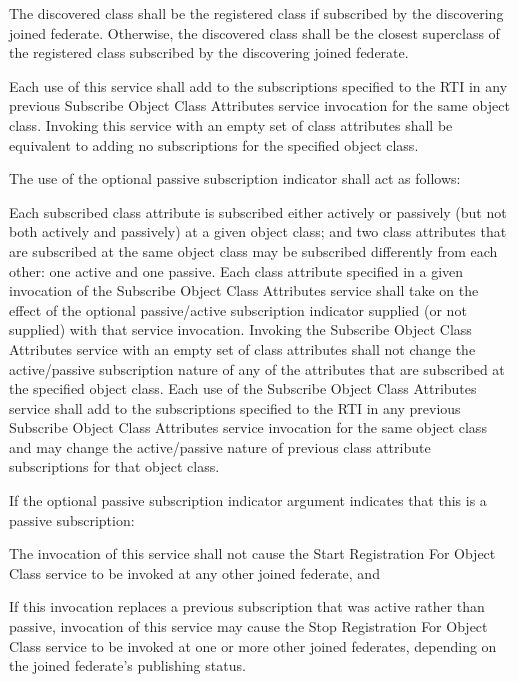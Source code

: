 \clearpage

\begin{compactstdpage}
    The discovered class shall be the registered class if subscribed by the discovering joined federate. Otherwise, the discovered class shall be the closest superclass of the registered class subscribed by the discovering joined federate.

    Each use of this service shall add to the subscriptions specified to the RTI in any previous Subscribe Object Class Attributes service invocation for the same object class. Invoking this service with an empty set of class attributes shall be equivalent to adding no subscriptions for the specified object class.

    The use of the optional passive subscription indicator shall act as follows:

    Each subscribed class attribute is subscribed either actively or passively (but not both actively and passively) at a given object class; and two class attributes that are subscribed at the same object class may be subscribed differently from each other: one active and one passive. Each class attribute specified in a given invocation of the Subscribe Object Class Attributes service shall take on the effect of the optional passive/active subscription indicator supplied (or not supplied) with that service invocation. Invoking the Subscribe Object Class Attributes service with an empty set of class attributes shall not change the active/passive subscription nature of any of the attributes that are subscribed at the specified object class. Each use of the Subscribe Object Class Attributes service shall add to the subscriptions specified to the RTI in any previous Subscribe Object Class Attributes service invocation for the same object class and may change the active/passive nature of previous class attribute subscriptions for that object class.

    If the optional passive subscription indicator argument indicates that this is a passive subscription:

    \begin{stdalphalist}
        \item The invocation of this service shall not cause the Start Registration For Object Class \rtiinitiated{} service to be invoked at any other joined federate, and
        \item If this invocation replaces a previous subscription that was active rather than passive, invocation of this service may cause the Stop Registration For Object Class \rtiinitiated{} service to be invoked at one or more other joined federates, depending on the joined federate's publishing status.
    \end{stdalphalist}


\end{compactstdpage}

